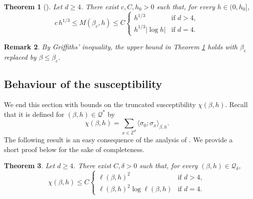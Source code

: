 \documentclass[10pt,a4paper]{amsart}
\numberwithin{equation}{section}
\newtheorem{Thm}{Theorem}[section]
\newtheorem{Rem}[Thm]{Remark}
\begin{document}
\begin{Thm}[]\label{thm: magnetisation} Let $d\geq 4$. There exist $c,C,h_0>0$ such that, for every $h\in(0,h_0]$,
\begin{equation}
	c\,h^{1/3}\leq M(\beta_c,h)\leq C\left\{
			\begin{array}{ll}
				h^{1/3} & \mbox{if } d>4, \\
				h^{1/3}|\log h| & \mbox{if }d=4.
			\end{array}
			\right.
	\end{equation}
\end{Thm}
\begin{Rem} By Griffiths' inequality, the upper bound in Theorem \ref{thm: magnetisation} holds with $\beta_c$ replaced by $\beta\leq \beta_c$.
\end{Rem}

\subsection{Behaviour of the susceptibility}
We end this section with bounds on the truncated susceptibility $\chi(\beta,h)$. Recall that it is defined for $(\beta,h)\in \mathcal Q^*$ by
\begin{equation}
	\chi(\beta,h)=\sum_{x\in \mathbb Z^d}\langle \sigma_0;\sigma_x\rangle_{\beta,h}.
\end{equation}
The following result is an easy consequence of the analysis of \cite{AizenmanGeometricAnalysis1982,AizenmanGrahamRenormalizedCouplingSusceptibility4d1983,AizenmanFernandezCriticalBehaviorMagnetization1986}. We provide a short proof below for the sake of completeness.
\begin{Thm}\label{thm: susceptibility} Let $d\geq 4$. There exist $C,\delta>0$ such that, for every $(\beta,h)\in \mathcal Q_\delta$,
\begin{equation}
\chi(\beta,h)\leq C\left\{
			\begin{array}{ll}
				\ell(\beta,h)^2 & \mbox{if } d>4, \\
				\ell(\beta,h)^2\log \ell(\beta,h) & \mbox{if }d=4.
			\end{array}
			\right.
\end{equation}
\end{Thm}
\end{document}
